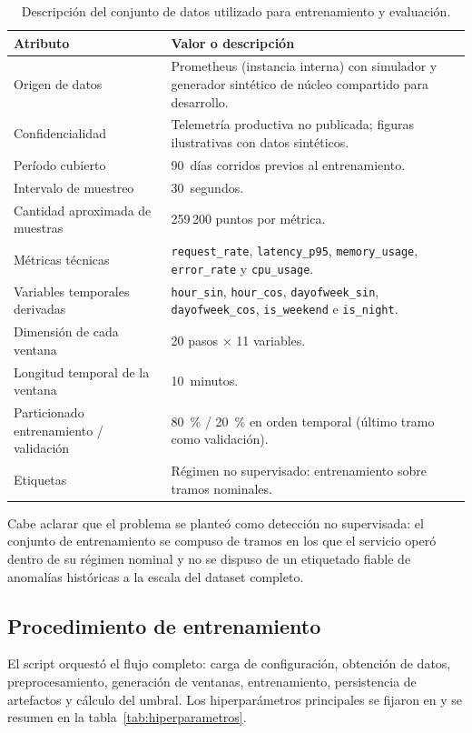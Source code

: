 \begin{table}[H]
\centering
\footnotesize
\caption{Descripción del conjunto de datos utilizado para entrenamiento y evaluación.}
\label{tab:dataset}
\begin{tabular}{@{}p{}p{}@{}}
\toprule
\textbf{Atributo} & \textbf{Valor o descripción} \\
\midrule
Origen de datos & Prometheus (instancia interna) con simulador y generador sintético de núcleo compartido para desarrollo. \\
Confidencialidad & Telemetría productiva no publicada; figuras ilustrativas con datos sintéticos. \\
Período cubierto & 90~días corridos previos al entrenamiento. \\
Intervalo de muestreo & 30~segundos. \\
Cantidad aproximada de muestras & 259\,200 puntos por métrica. \\
Métricas técnicas & \texttt{request\_rate}, \texttt{latency\_p95}, \texttt{memory\_usage}, \texttt{error\_rate} y \texttt{cpu\_usage}. \\
Variables temporales derivadas & \texttt{hour\_sin}, \texttt{hour\_cos}, \texttt{dayofweek\_sin}, \texttt{dayofweek\_cos}, \texttt{is\_weekend} e \texttt{is\_night}. \\
Dimensión de cada ventana & 20 pasos $\times$ 11 variables. \\
Longitud temporal de la ventana & 10~minutos. \\
Particionado entrenamiento / validación & 80~\% / 20~\% en orden temporal (último tramo como validación). \\
Etiquetas & Régimen no supervisado: entrenamiento sobre tramos nominales. \\
\bottomrule
\end{tabular}
\end{table}

Cabe aclarar que el problema se planteó como detección no supervisada: el conjunto de entrenamiento se compuso de tramos en los que el servicio operó dentro de su régimen nominal y no se dispuso de un etiquetado fiable de anomalías históricas a la escala del dataset completo.

\subsection{Procedimiento de entrenamiento}

El script  orquestó el flujo completo: carga de configuración, obtención de datos, preprocesamiento, generación de ventanas, entrenamiento, persistencia de artefactos y cálculo del umbral. Los hiperparámetros principales se fijaron en  y se resumen en la tabla~\ref{tab:hiperparametros}.

